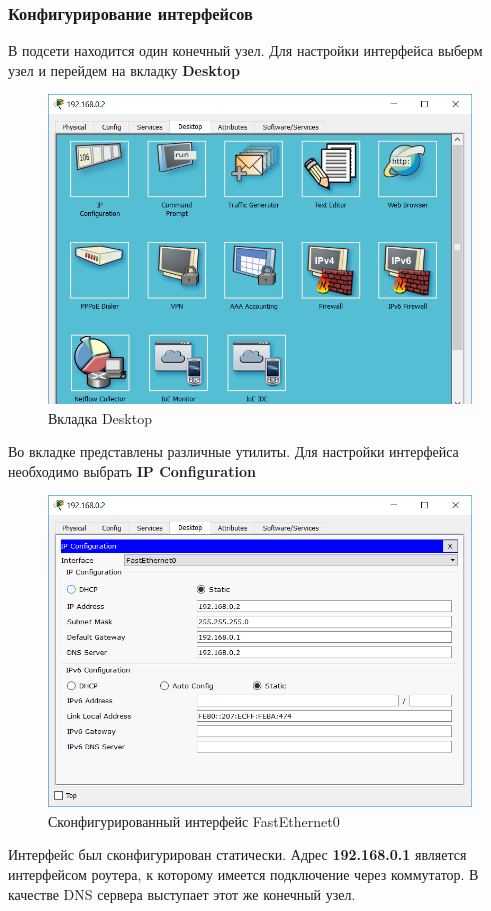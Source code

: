 \subsubsection{Конфигурирование интерфейсов}
В подсети находится один конечный узел. Для настройки интерфейса выберм узел и перейдем на вкладку \textbf{Desktop}
\begin{figure}[H]
  \centering
  \includegraphics[width=.8\textwidth]{img/net0_0_2__0}
  \caption{Вкладка Desktop}
\end{figure}
Во вкладке представлены различные утилиты. Для настройки интерфейса необходимо выбрать \textbf{IP Configuration}
\begin{figure}[H]
  \centering
  \includegraphics[width=.8\textwidth]{img/net0_0_2__1}
  \caption{Сконфигурированный интерфейс FastEthernet0}
\end{figure}
Интерфейс был сконфигурирован статически. Адрес \textbf{192.168.0.1} является интерфейсом роутера, к которому имеется подключение через коммутатор. В качестве DNS сервера выступает этот же конечный узел.
